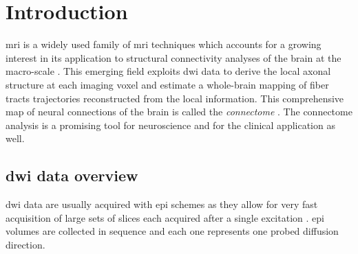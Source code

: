 \section{Introduction}
\label{sec:introduction}

 \gls{mri} is a widely used family
  of \gls{mri} techniques \citep{sundgren_diffusion_2004} which
  accounts for a growing interest in its application to structural
  connectivity analyses of the brain at the macro-scale
  \citep{craddock_imaging_2013}.
This emerging field exploits \gls{dwi} data to derive the local axonal structure at
  each imaging voxel \citep{basser_microstructural_1996} and estimate a whole-brain
  mapping of fiber tracts \citep{hagmann_mr_2010,berg_using_2009} trajectories
  reconstructed from the local information.
This comprehensive map of neural connections of the brain is called the
  \emph{connectome} \citep{hagmann_from_2005,sporns_human_2005}.
The connectome analysis is a promising tool for neuroscience \citep{morgan_why_2013}
  and for the clinical application \citep{griffa_structural_2013} as well.



\subsection{\Gls{dwi} data overview}
\label{sec:dwi_overview}
\gls{dwi} data are usually acquired with \gls{epi} schemes as they allow for very
  fast acquisition of large sets of slices each acquired after a single excitation
  \citep{mukherjee_diffusion_2008,soares_hitchhikers_2013}.
\Gls{epi} volumes are collected in sequence and each one represents one probed
  diffusion direction.

